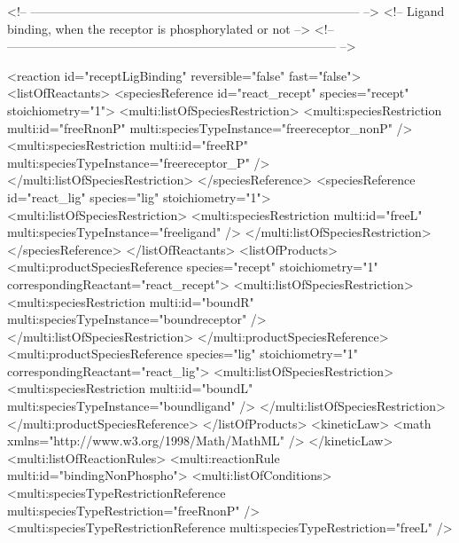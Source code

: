 \begin{example}
<!-- -------------------------------------------------------------------------------- -->
<!-- Ligand binding, when the receptor is phosphorylated or not                       -->
<!-- -------------------------------------------------------------------------------- -->      
       
      <reaction id="receptLigBinding" reversible="false" fast="false"> 
        <listOfReactants>
          <speciesReference id="react_recept" species="recept" stoichiometry="1">
            <multi:listOfSpeciesRestriction>
              <multi:speciesRestriction multi:id="freeRnonP" 
                                        multi:speciesTypeInstance="freereceptor_nonP" />
              <multi:speciesRestriction multi:id="freeRP" 
                                        multi:speciesTypeInstance="freereceptor_P" />
            </multi:listOfSpeciesRestriction>
          </speciesReference>
          <speciesReference id="react_lig" species="lig" stoichiometry="1">
            <multi:listOfSpeciesRestriction>
              <multi:speciesRestriction multi:id="freeL" 
                                        multi:speciesTypeInstance="freeligand" />
            </multi:listOfSpeciesRestriction>
          </speciesReference>
        </listOfReactants>
        <listOfProducts>
          <multi:productSpeciesReference species="recept" stoichiometry="1"
                                   correspondingReactant="react_recept">
            <multi:listOfSpeciesRestriction>
              <multi:speciesRestriction multi:id="boundR" 
                                        multi:speciesTypeInstance="boundreceptor" />
            </multi:listOfSpeciesRestriction>
          </multi:productSpeciesReference>
          <multi:productSpeciesReference species="lig" stoichiometry="1"
                                   correspondingReactant="react_lig">
            <multi:listOfSpeciesRestriction>
              <multi:speciesRestriction multi:id="boundL" 
                                        multi:speciesTypeInstance="boundligand" />
            </multi:listOfSpeciesRestriction>
          </multi:productSpeciesReference>
        </listOfProducts>
        <kineticLaw>
          <math xmlns="http://www.w3.org/1998/Math/MathML" />
        </kineticLaw>
        <multi:listOfReactionRules>
          <multi:reactionRule multi:id="bindingNonPhospho">
            <multi:listOfConditions>
              <multi:speciesTypeRestrictionReference multi:speciesTypeRestriction="freeRnonP" />
              <multi:speciesTypeRestrictionReference multi:speciesTypeRestriction="freeL" />

\end{example}
